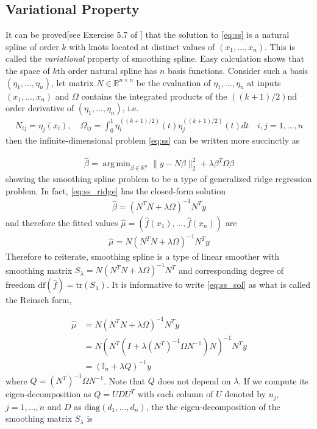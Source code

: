 \documentclass[a4paper]{article}
\DeclareMathOperator*{\argmin}{arg\,min}
\newcommand{\RR}{\mathbb{R}}
\begin{document}
\subsection{Variational Property}
\label{subsec:var_property}
It can be proved[see Exercise 5.7 of \cite{friedman2001elements}] that the solution to \eqref{eq:ss} is a natural spline of order $k$ with knots located at distinct values of $(x_1,\ldots, x_n)$. This is called the \textit{variational} property of smoothing spline\cite{anselone1968general}. Easy calculation shows that the space of $k$th order natural spline has $n$ basis functions. Consider such a basis $(\eta_1,\ldots, \eta_n)$, let matrix $N\in\RR^{n\times n}$ be the evaluation of $\eta_1,\ldots, \eta_n$ at inputs $(x_1,\ldots, x_n)$ and $\Omega$ contains the integrated products of the $((k+1)/2)$nd order derivative of $(\eta_1,\ldots, \eta_n)$, i.e.
\begin{align}
N_{ij} = \eta_j(x_i), \quad \Omega_{ij} = \int_0^1 \eta_i^{((k+1)/2)}(t)\eta_j^{((k+1)/2)}(t)dt \quad i,j=1,\ldots,n
\label{eq:ss_N}
\end{align}
then the infinite-dimensional problem \eqref{eq:ss} can be written more succinctly as

\begin{align}
\hat{\beta} = \argmin_{\beta\in\RR^n} \|y-N\beta\|_2^2 + \lambda\beta^T\Omega\beta
\label{eq:ss_ridge}
\end{align}
showing the smoothing spline problem to be a type of generalized ridge regression problem. In fact, \eqref{eq:ss_ridge} has the closed-form solution
\begin{align}
\hat{\beta} = (N^TN + \lambda\Omega)^{-1}N^Ty
\end{align}
and therefore the fitted values $\hat{\mu} = (\hat{f}(x_1),\ldots, \hat{f}(x_n))$ are
\begin{align}
\hat{\mu} = N(N^TN + \lambda\Omega)^{-1}N^Ty
\label{eq:ss_sol}
\end{align}
Therefore to reiterate, smoothing spline is a type of linear smoother with smoothing matrix $S_\lambda = N(N^TN + \lambda\Omega)^{-1}N^T$ and corresponding degree of freedom $\mbox{df}(\hat{f}) = \mbox{tr}(S_\lambda)$. It is informative to write \eqref{eq:ss_sol} as what is called the Reinsch form,

\begin{equation}
\begin{aligned}
\hat{\mu} &= N(N^TN + \lambda\Omega)^{-1}N^Ty\\
&= N(N^T(I + \lambda (N^T)^{-1}\Omega N^{-1})N)^{-1}N^Ty\\
&= (\mathbb{I}_n + \lambda Q)^{-1}y
\end{aligned}
\label{eq:ss_reinsch}
\end{equation}
where $Q =(N^T)^{-1}\Omega N^{-1}$. Note that $Q$ does not depend on $\lambda$. If we compute its eigen-decomposition as $Q = UDU^T$ with each column of $U$ denoted by $u_j$, $j=1,\ldots, n$ and $D$ as $\mbox{diag}(d_1,\ldots, d_n)$, the the eigen-decomposition of the smoothing matrix $S_\lambda$ is 
\end{document}
